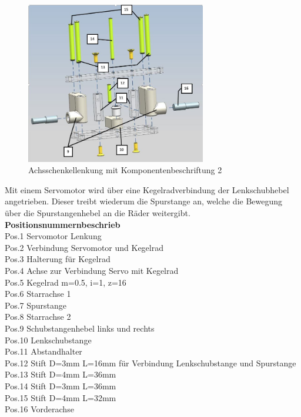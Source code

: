 \begin{figure}[H]%
\centering
\includegraphics[width=0.7\textwidth]{03_Loesungskonzept/pictures2/Lenkung_Explosion_2_lg.JPG}
\caption{Achsschenkellenkung mit Komponentenbeschriftung 2}
\label{fig:activityRoute}
\end{figure}
Mit einem Servomotor wird über eine Kegelradverbindung der Lenkschubhebel angetrieben. Dieser treibt wiederum die Spurstange an, welche die Bewegung über die Spurstangenhebel an die Räder weitergibt.\\[0.2cm]
\textbf{Positionsnummernbeschrieb}\\[0.2cm]
Pos.1 	Servomotor Lenkung\\
Pos.2 	Verbindung Servomotor und Kegelrad\\
Pos.3 	Halterung für Kegelrad\\
Pos.4 	Achse zur Verbindung Servo mit Kegelrad\\
Pos.5 	Kegelrad m=0.5, i=1, z=16\\
Pos.6 	Starrachse 1\\
Pos.7 	Spurstange\\
Pos.8	Starrachse 2\\
Pos.9	Schubstangenhebel links und rechts\\
Pos.10	Lenkschubstange\\
Pos.11	Abstandhalter\\
Pos.12	Stift D=3mm L=16mm für Verbindung Lenkschubstange und Spurstange\\
Pos.13	Stift D=4mm L=36mm\\
Pos.14	Stift D=3mm L=36mm\\
Pos.15	Stift D=4mm L=32mm\\
Pos.16	Vorderachse\\
